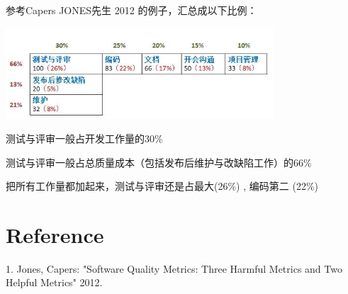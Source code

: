 参考Capers JONES先生 2012 的例子，汇总成以下比例：


\includegraphics[width=10cm]{AR1成本占比.jpg}

测试与评审一般占开发工作量的30\%

测试与评审一般占总质量成本（包括发布后维护与改缺陷工作）的66\%

把所有工作量都加起来，测试与评审还是占最大(26\%) , 编码第二 (22\%)


\hypertarget{reference}{%
\section{Reference}\label{reference}}

1. Jones, Capers: "Software Quality Metrics: Three Harmful Metrics and
Two Helpful Metrics" 2012.\\
